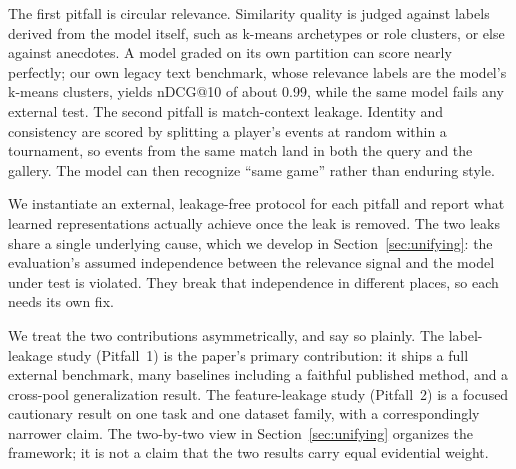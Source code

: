 The first pitfall is circular relevance. Similarity quality is judged against
labels derived from the model itself, such as k-means archetypes or role
clusters, or else against anecdotes. A model graded on its own partition can
score nearly perfectly; our own legacy text benchmark, whose relevance labels
are the model's k-means clusters, yields nDCG@10 of about 0.99, while the same
model fails any external test. The second pitfall is match-context leakage.
Identity and consistency are scored by splitting a player's events at random
within a tournament, so events from the same match land in both the query and
the gallery. The model can then recognize ``same game'' rather than enduring
style.

We instantiate an external, leakage-free protocol for each pitfall and report
what learned representations actually achieve once the leak is removed. The
two leaks share a single underlying cause, which we develop in
Section~\ref{sec:unifying}: the evaluation's assumed independence between the
relevance signal and the model under test is violated. They break that
independence in different places, so each needs its own fix.

We treat the two contributions asymmetrically, and say so plainly. The label-leakage
study (Pitfall~1) is the paper's primary contribution: it ships a full
external benchmark, many baselines including a faithful published method, and
a cross-pool generalization result. The feature-leakage study (Pitfall~2) is a
focused cautionary result on one task and one dataset family, with a
correspondingly narrower claim. The two-by-two view in
Section~\ref{sec:unifying} organizes the framework; it is not a claim that the
two results carry equal evidential weight.

